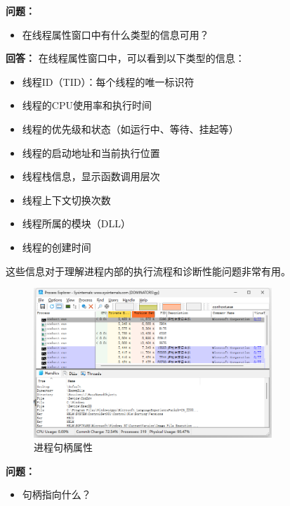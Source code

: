 \documentclass[12pt,a4paper]{article}
\begin{document}
\textbf{问题：}
\begin{itemize}
    \item 在线程属性窗口中有什么类型的信息可用？
\end{itemize}

\textbf{回答：}
在线程属性窗口中，可以看到以下类型的信息：
\begin{itemize}
    \item 线程ID（TID）：每个线程的唯一标识符
    \item 线程的CPU使用率和执行时间
    \item 线程的优先级和状态（如运行中、等待、挂起等）
    \item 线程的启动地址和当前执行位置
    \item 线程栈信息，显示函数调用层次
    \item 线程上下文切换次数
    \item 线程所属的模块（DLL）
    \item 线程的创建时间
\end{itemize}
这些信息对于理解进程内部的执行流程和诊断性能问题非常有用。

\begin{figure}[H]
    \centering
    \includegraphics[width=0.8\textwidth]{handles.png}
    \caption{进程句柄属性}
    \label{fig:handles}
\end{figure}

\textbf{问题：}
\begin{itemize}
    \item 句柄指向什么？
\end{itemize}
\end{document}
